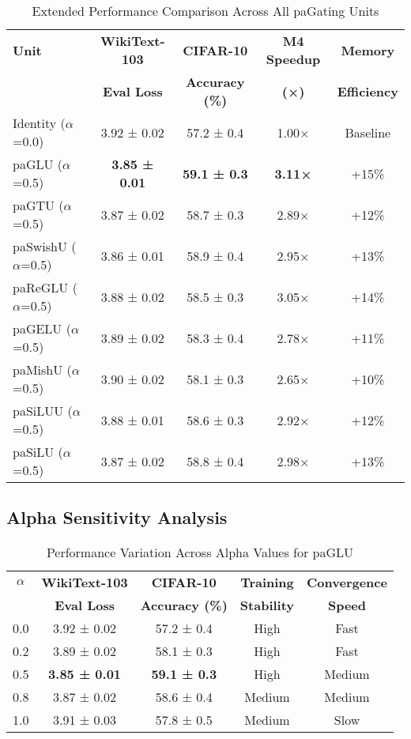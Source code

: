 \documentclass[journal]{IEEEtran}
\begin{document}
\begin{table}[h]
\centering
\caption{Extended Performance Comparison Across All paGating Units}
\begin{tabular}{@{}lcccc@{}}
\toprule
\textbf{Unit} & \textbf{WikiText-103} & \textbf{CIFAR-10} & \textbf{M4 Speedup} & \textbf{Memory} \\
              & \textbf{Eval Loss} & \textbf{Accuracy (\%)} & \textbf{(×)} & \textbf{Efficiency} \\
\midrule
Identity ($\alpha$=0.0) & 3.92 ± 0.02 & 57.2 ± 0.4 & 1.00× & Baseline \\
paGLU ($\alpha$=0.5) & \textbf{3.85 ± 0.01} & \textbf{59.1 ± 0.3} & \textbf{3.11×} & +15\% \\
paGTU ($\alpha$=0.5) & 3.87 ± 0.02 & 58.7 ± 0.3 & 2.89× & +12\% \\
paSwishU ($\alpha$=0.5) & 3.86 ± 0.01 & 58.9 ± 0.4 & 2.95× & +13\% \\
paReGLU ($\alpha$=0.5) & 3.88 ± 0.02 & 58.5 ± 0.3 & 3.05× & +14\% \\
paGELU ($\alpha$=0.5) & 3.89 ± 0.02 & 58.3 ± 0.4 & 2.78× & +11\% \\
paMishU ($\alpha$=0.5) & 3.90 ± 0.02 & 58.1 ± 0.3 & 2.65× & +10\% \\
paSiLUU ($\alpha$=0.5) & 3.88 ± 0.01 & 58.6 ± 0.3 & 2.92× & +12\% \\
paSiLU ($\alpha$=0.5) & 3.87 ± 0.02 & 58.8 ± 0.4 & 2.98× & +13\% \\
\bottomrule
\end{tabular}
\end{table}

\subsection{Alpha Sensitivity Analysis}

\begin{table}[h]
\centering
\caption{Performance Variation Across Alpha Values for paGLU}
\begin{tabular}{@{}ccccc@{}}
\toprule
\textbf{$\alpha$} & \textbf{WikiText-103} & \textbf{CIFAR-10} & \textbf{Training} & \textbf{Convergence} \\
           & \textbf{Eval Loss} & \textbf{Accuracy (\%)} & \textbf{Stability} & \textbf{Speed} \\
\midrule
0.0 & 3.92 ± 0.02 & 57.2 ± 0.4 & High & Fast \\
0.2 & 3.89 ± 0.02 & 58.1 ± 0.3 & High & Fast \\
0.5 & \textbf{3.85 ± 0.01} & \textbf{59.1 ± 0.3} & High & Medium \\
0.8 & 3.87 ± 0.02 & 58.6 ± 0.4 & Medium & Medium \\
1.0 & 3.91 ± 0.03 & 57.8 ± 0.5 & Medium & Slow \\
\bottomrule
\end{tabular}
\end{table}
\end{document}
